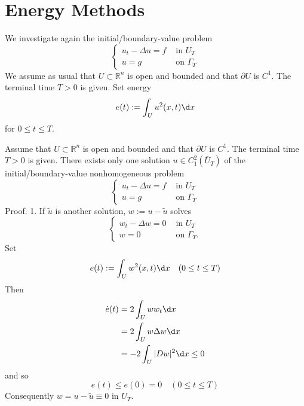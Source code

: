 \section{Energy Methods}
\begin{theorem}
    We investigate again the initial/boundary-value problem
    \begin{equation*}
        \left\{\begin{aligned}
            u_t-\Delta u=f & \text { in } U_T      \\
            u=g            & \text { on } \Gamma_T
        \end{aligned}\right.
    \end{equation*}
    We assume as usual that $U \subset \mathbb{R}^n$ is open and bounded and that $\partial U$ is $C^1$. The terminal time $T>0$ is given. Set energy
    \begin{equation*}
        e(t):=\int_U u^2(x, t) \d x
    \end{equation*}
    for $0 \leq t \leq T$.
\end{theorem}
\begin{theorem}[Uniqueness]
    Assume that $U \subset \mathbb{R}^n$ is open and bounded and that $\partial U$ is $C^1$. The terminal time $T>0$ is given.
    There exists only one solution $u \in C_1^2\left(\bar{U}_T\right)$ of the initial/boundary-value nonhomogeneous problem
    \begin{equation*}
        \left\{\begin{aligned}
            u_t-\Delta u=f & \text { in } U_T      \\
            u=g            & \text { on } \Gamma_T
        \end{aligned}\right.
    \end{equation*}
    Proof. 1. If $\tilde{u}$ is another solution, $w:=u-\tilde{u}$ solves
    \begin{equation*}
        \left\{
        \begin{aligned}
            w_t-\Delta w=0 & \text { in } U_T        \\
            w=0            & \text { on } \Gamma_T .
        \end{aligned}
        \right.
    \end{equation*}
    Set
    \begin{equation*}
        e(t):=\int_U w^2(x, t) \d x \quad(0 \leq t \leq T)
    \end{equation*}
    Then
    \begin{equation*}
        \begin{aligned}
            \dot{e}(t) & =2 \int_U w w_t \d x          \\
                       & =2 \int_U w \Delta w \d x     \\
                       & =-2 \int_U|D w|^2 \d x \leq 0
        \end{aligned}
    \end{equation*}
    and so
    \begin{equation*}
        e(t) \leq e(0)=0 \quad(0 \leq t \leq T)
    \end{equation*}
    Consequently $w=u-\tilde{u} \equiv 0$ in $U_T$.
\end{theorem}
